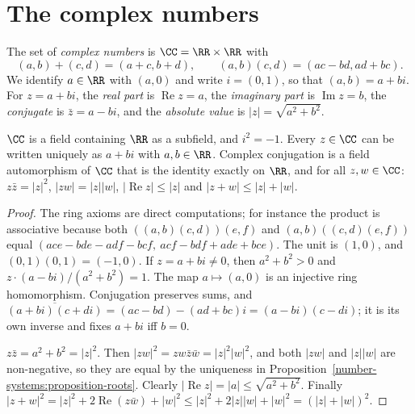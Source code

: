 \section{The complex numbers}\label{number-systems:section-complex}

\begin{definition}\label{number-systems:definition-complex}
The set of \emph{complex numbers} is $\CC = \RR \times \RR$ with
\[
(a, b) + (c, d) = (a + c, b + d), \qquad (a, b)(c, d) = (ac - bd, ad + bc).
\]
We identify $a \in \RR$ with $(a, 0)$ and write $i = (0, 1)$, so that
$(a, b) = a + bi$. For $z = a + bi$, the \emph{real part} is $\operatorname{Re} z = a$,
the \emph{imaginary part} is $\operatorname{Im} z = b$, the \emph{conjugate} is
$\bar z = a - bi$, and the \emph{absolute value} is $|z| = \sqrt{a^2 + b^2}$.
\end{definition}

\begin{theorem}\label{number-systems:theorem-complex}
$\CC$ is a field containing $\RR$ as a subfield, and $i^2 = -1$. Every
$z \in \CC$ can be written uniquely as $a + bi$ with $a, b \in \RR$. Complex
conjugation is a field automorphism of $\CC$ that is the identity exactly on
$\RR$, and for all $z, w \in \CC$:
$z \bar z = |z|^2$, $|zw| = |z||w|$, $|\operatorname{Re} z| \leq |z|$ and
$|z + w| \leq |z| + |w|$.
\end{theorem}

\begin{proof}
The ring axioms are direct computations; for instance the product is
associative because both $((a,b)(c,d))(e,f)$ and $(a,b)((c,d)(e,f))$ equal
$(ace - bde - adf - bcf,\ acf - bdf + ade + bce)$. The unit is $(1, 0)$, and
$(0,1)(0,1) = (-1, 0)$. If $z = a + bi \neq 0$, then $a^2 + b^2 > 0$ and
$z \cdot (a - bi)/(a^2 + b^2) = 1$. The map $a \mapsto (a, 0)$ is an injective ring
homomorphism. Conjugation preserves sums, and
$\overline{(a + bi)(c + di)} = (ac - bd) - (ad + bc)i = (a - bi)(c - di)$; it is
its own inverse and fixes $a + bi$ iff $b = 0$.

$z \bar z = a^2 + b^2 = |z|^2$. Then $|zw|^2 = zw\bar z\bar w = |z|^2|w|^2$, and
both $|zw|$ and $|z||w|$ are non-negative, so they are equal by the uniqueness
in Proposition~\ref{number-systems:proposition-roots}. Clearly
$|\operatorname{Re} z| = |a| \leq \sqrt{a^2 + b^2}$. Finally
$|z + w|^2 = |z|^2 + 2\operatorname{Re}(z \bar w) + |w|^2 \leq |z|^2 + 2|z||w| + |w|^2 = (|z| + |w|)^2$.
\end{proof}

